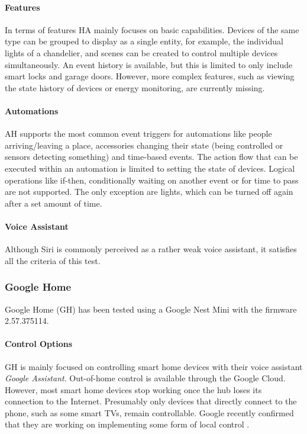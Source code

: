 \paragraph{Features}
In terms of features HA mainly focuses on basic capabilities. Devices of the same type can be grouped to display as a single entity, for example, the individual lights of a chandelier, and scenes can be created to control multiple devices simultaneously. An event history is available, but this is limited to only include smart locks and garage doors. However, more complex features, such as viewing the state history of devices or energy monitoring, are currently missing.

\paragraph{Automations}
AH supports the most common event triggers for automations like people arriving/leaving a place, accessories changing their state (being controlled or sensors detecting something) and time-based events. The action flow that can be executed within an automation is limited to setting the state of devices. Logical operations like if-then, conditionally waiting on another event or for time to pass are not supported. The only exception are lights, which can be turned off again after a set amount of time.

\paragraph{Voice Assistant}
Although Siri is commonly perceived as a rather weak voice assistant, it satisfies all the criteria of this test.

\newpage
\subsubsection{Google Home}
Google Home (GH) has been tested using a Google Nest Mini with the firmware 2.57.375114.

\paragraph{Control Options}
GH is mainly focused on controlling smart home devices with their voice assistant \textit{Google Assistant}.
Out-of-home control is available through the Google Cloud. However, most smart home devices stop working once the hub loses its connection to the Internet. Presumably only devices that directly connect to the phone, such as some smart TVs, remain controllable. Google recently confirmed that they are working on implementing some form of local control \cite{Reddit_r/GoogleHome2023OfflineMode}.

